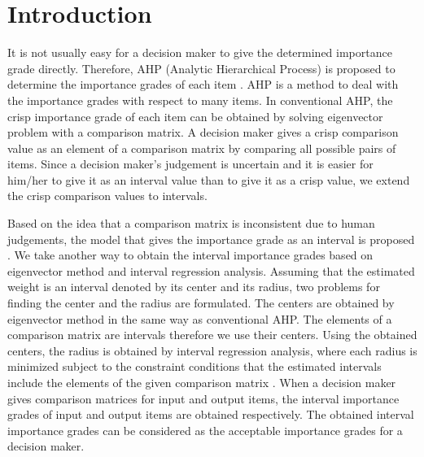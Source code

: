 \section{Introduction}

It is not usually easy for a decision maker to give the determined importance grade directly. 
Therefore, AHP (Analytic Hierarchical Process) is proposed to determine the importance grades of each item \cite{Saaty}. 
AHP is a method to deal with the importance grades with respect to many items. 
In conventional AHP, the crisp importance grade of each item can be obtained by solving eigenvector problem with a comparison matrix. 
A decision maker gives a crisp comparison value as an element of a comparison matrix by comparing all possible pairs of items. 
Since a decision maker's judgement is uncertain and it is easier for him/her to give it as an interval value than to give it as a crisp value, we extend the crisp comparison values to intervals. 

Based on the idea that a comparison matrix is inconsistent due to human judgements, the model that gives the importance grade as an interval is proposed \cite{IntervalAHP}. 
We take another way to obtain the interval importance grades based on eigenvector method and interval regression analysis. 
Assuming that the estimated weight is an interval denoted by its center and its radius, two problems for finding the center and the radius are formulated. 
The centers are obtained by eigenvector method in the same way as conventional AHP. 
The elements of a comparison matrix are intervals therefore we use their centers. 
Using the obtained centers, the radius is obtained by interval regression analysis, where each radius is minimized subject to the constraint conditions that the estimated intervals include the elements of the given comparison matrix \cite{IntervalRA}. 
When a decision maker gives comparison matrices for input and output items, the interval importance grades of input and output items are obtained respectively. 
The obtained interval importance grades can be considered as the acceptable importance grades for a decision maker. 

